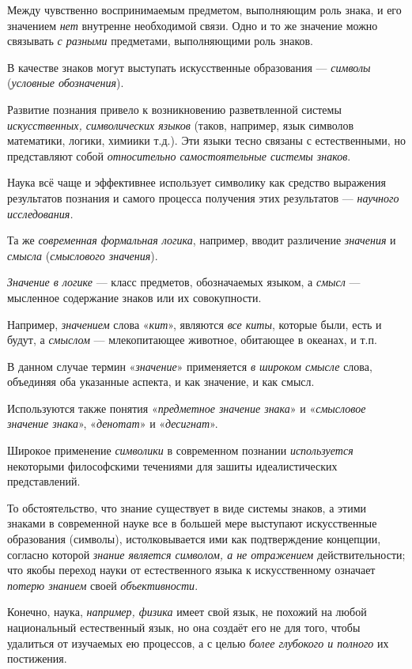 \documentclass[a4paper,14pt,russian]{extreport}
\begin{document}
Между чувственно воспринимаемым предметом, выполняющим роль знака, и его значением \emph{нет} внутренне необходимой связи. Одно и то же значение можно связывать \emph{с разными} предметами, выполняющими роль знаков.

В качестве знаков могут выступать искусственные образования --- \emph{символы} (\emph{условные обозначения}).

Развитие познания привело к возникновению разветвленной системы \emph{искусственных, символических языков} (таков, например, язык символов математики, логики, химиики т.д.). Эти языки тесно связаны с естественными, но представляют собой \emph{относительно самостоятельные системы знаков}.

Наука всё чаще и эффективнее использует символику как средство выражения результатов познания и самого процесса получения этих результатов --- \emph{научного исследования.}

Та же \emph{современная формальная логика}, например, вводит различение \emph{значения} и \emph{смысла} (\emph{смыслового значения}).

\emph{Значение в логике} --- класс предметов, обозначаемых языком, а \emph{смысл} --- мысленное содержание знаков или их совокупности.

Например, \emph{значением} слова «\emph{кит}», являются \emph{все киты}, которые были, есть и будут, а \emph{смыслом} --- млекопитающее животное, обитающее в океанах, и т.п.

В данном случае термин «\emph{значение}» применяется \emph{в широком смысле} слова, объединяя оба указанные аспекта, и как значение, и как смысл.

Используются также понятия «\emph{предметное значение знака}» и «\emph{смысловое значение знака}», «\emph{денотат}» и «\emph{десигнат}».

Широкое применение \emph{символики} в современном познании \emph{используется} некоторыми философскими течениями для зашиты идеалистических представлений.

То обстоятельство, что знание существует в виде системы знаков, а этими знаками в современной науке все в большей мере выступают искусственные образования (символы), истолковывается ими как подтверждение концепции, согласно которой \emph{знание является символом, а не отражением} действительности; что якобы переход науки от естественного языка к искусственному означает \emph{потерю знанием} своей \emph{объективности}.

Конечно, наука, \emph{например, физика} имеет свой язык, не похожий на любой национальный естественный язык, но она создаёт его не для того, чтобы удалиться от изучаемых ею процессов, а с целью \emph{более глубокого и полного} их постижения.
\end{document}
